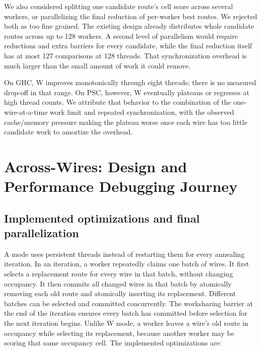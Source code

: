 \documentclass[11pt]{article}
\begin{document}
We also considered splitting one candidate route's cell score across several
workers, or parallelizing the final reduction of per-worker best routes. We
rejected both as too fine grained. The existing design already distributes
whole candidate routes across up to 128 workers. A second level of parallelism
would require reductions and extra barriers for every candidate, while the
final reduction itself has at most 127 comparisons at 128 threads. That
synchronization overhead is much larger than the small amount of work it could
remove.

On GHC, W improves monotonically through eight threads; there is no measured
drop-off in that range. On PSC, however, W eventually plateaus or regresses at
high thread counts. We attribute that behavior to the combination of the
one-wire-at-a-time work limit and repeated synchronization, with the observed
cache/memory pressure making the plateau worse once each wire has too little
candidate work to amortize the overhead.

\FloatBarrier

\section{Across-Wires: Design and Performance Debugging Journey}
\label{sec:across}

\subsection{Implemented optimizations and final parallelization}

A mode uses persistent threads instead of restarting them for every annealing
iteration. In an iteration, a worker repeatedly claims one batch of wires. It
first selects a replacement route for every wire in that batch, without changing
occupancy. It then commits all changed wires in that batch by atomically
removing each old route and atomically inserting its replacement. Different
batches can be selected and committed concurrently. The worksharing barrier at
the end of the iteration ensures every batch has committed before selection for
the next iteration begins. Unlike W mode, a worker leaves a wire's old route in
occupancy while selecting its replacement, because another worker may be
scoring that same occupancy cell. The implemented optimizations are:
\end{document}

